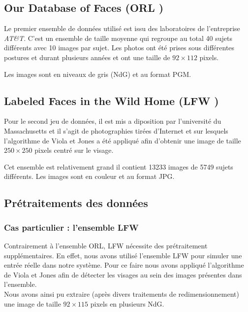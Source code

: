 \documentclass[a4paper,10pt,twocolumn]{extarticle}
\begin{document}
\subsection{Our Database of Faces (ORL \cite{orl})}
Le premier ensemble de données utilisé est issu des laboratoires de l'entreprise \textit{AT\&T}. C'est un ensemble de taille moyenne qui regroupe au total 40 sujets différents avec 10 images par sujet. Les photos ont été prises sous différentes postures et durant plusieurs années et ont une taille de $92 \times 112$ pixels.

Les images sont en niveaux de gris (NdG) et au format PGM.

\subsection{Labeled Faces in the Wild Home (LFW \cite{lfw})}
Pour le second jeu de données, il est mis a diposition par l'université du Massachusetts et il s'agit de photographies tirées d'Internet et sur lesquels l'algorithme de Viola et Jones \cite{viola01} a été appliqué afin d'obtenir une image de taille $250 \times 250$ pixels centré sur le visage.

Cet ensemble est relativement grand il contient 13233 images de 5749 sujets différents. Les images sont en couleur et au format JPG.

\subsection{Prétraitements des données}
\subsubsection{Cas particulier : l'ensemble LFW}
Contrairement à l'ensemble ORL, LFW nécessite des prétraitement supplémentaires. En effet, nous avons utilisé l'ensemble LFW pour simuler une entrée réelle dans notre système. Pour ce faire nous avons appliqué l'algorithme de Viola et Jones afin de détecter les visages au sein des images présentes dans l'ensemble.\\
Nous avons ainsi pu extraire (après divers traitements de redimensionnement) une image de taille $92 \times 115$ pixels en plusieurs NdG.
\end{document}
